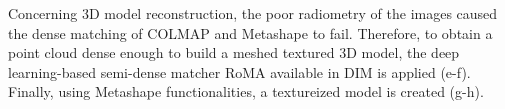 Concerning 3D model reconstruction, the poor radiometry of the images caused the dense matching of COLMAP and Metashape to fail. 
Therefore, to obtain a point cloud dense enough to build a meshed textured 3D model, the deep learning-based semi-dense matcher RoMA available in DIM is applied (e-f). 
Finally, using Metashape functionalities, a textureized model is created (g-h).

\begin{figure}
  \centering
   \\
   \qquad
\end{figure}
